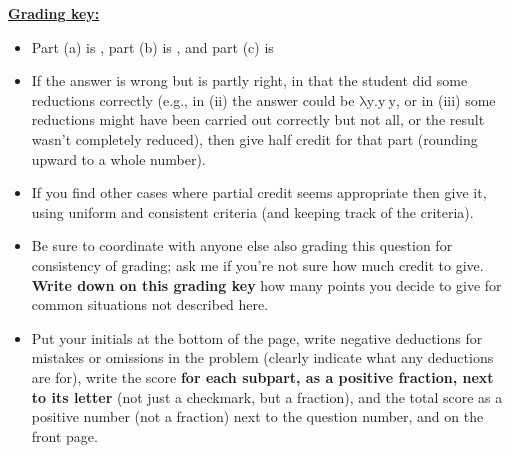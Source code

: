 \documentclass[11pt,fleqn]{article}
\begin{document}
\begin{enumerate}
\begin{info}{\textbf{\underline{Grading key:}}}
\begin{itemize}
              \addtolength{\itemsep}{1mm}

              \item Part (a) is , part (b) is
                    , and part (c) is 

              \item If the answer is wrong but is partly right, in that the
                    student did some reductions correctly (e.g., in (ii) the
                    answer could be $\mathrm{\lambda y.y \: y}$, or in (iii)
                    some reductions might have been carried out correctly
                    but not all, or the result wasn't completely reduced),
                    then give half credit for that part (rounding upward
                    to a whole number).

              \item If you find other cases where partial credit seems
                    appropriate then give it, using uniform and consistent
                    criteria (and keeping track of the criteria).

              \item Be sure to coordinate with anyone else also grading this
                    question for consistency of grading; ask me if you're
                    not sure how much credit to give.  \textbf{Write down on
                    this grading key} how many points you decide to give
                    for common situations not described here.

              \item Put your initials at the bottom of the page, write
                    negative deductions for mistakes or omissions in the
                    problem (clearly indicate what any deductions are for),
                    write the score \textbf{for each subpart, as a positive
                    fraction, next to its letter} (not just a checkmark,
                    but a fraction), and the total score as a positive
                    number (not a fraction) next to the question number, and
                    on the front page.

            \end{itemize}

          \end{info}

          \pagebreak



\end{enumerate}
\end{document}
